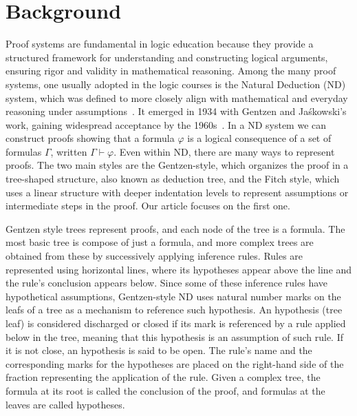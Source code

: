 \section{Background}
Proof systems are fundamental in logic education because they provide a structured framework for understanding and constructing logical arguments, ensuring rigor and validity in mathematical reasoning. Among the many proof systems, one usually adopted in the logic courses is the Natural Deduction (ND) system, which was defined to more closely align with mathematical and everyday reasoning under assumptions~\cite{nd-mancosu}. It emerged in 1934 with Gentzen and Jaśkowski's work, gaining widespread acceptance by the 1960s~\cite{Pelletier1999-FRAABH}. In a ND system we can construct proofs showing that a formula \(\varphi\) is a logical consequence of a set of formulas \(\Gamma\), written \(\Gamma \vdash \varphi\). 
Even within ND, there are many ways to represent proofs. The two main styles are the Gentzen-style, which organizes the proof in a tree-shaped structure, also known as deduction tree, and the Fitch style, which uses a linear structure with deeper indentation levels to represent assumptions or intermediate steps in the proof. Our article focuses on the first one. 

Gentzen style trees represent proofs, and each node of the tree is a formula. The most basic tree is compose of just a formula, and more complex trees are obtained from these by successively applying inference rules. Rules are represented using horizontal lines, where its hypotheses appear above the line and the rule’s conclusion appears below. Since some of these inference rules have hypothetical assumptions, Gentzen-style ND uses natural number marks on the leafs of a tree as a mechanism to reference such hypothesis. An hypothesis (tree leaf) is considered discharged or closed if its mark is referenced by a rule applied below in the tree, meaning that this hypothesis is an assumption of such rule. If it is not close, an hypothesis is said to be open. The rule’s name and the corresponding marks for the hypotheses are placed on the right-hand side of the fraction representing the application of the rule.
Given a complex tree, the formula at its root is called the conclusion of the proof, and formulas at the leaves are called hypotheses.   

